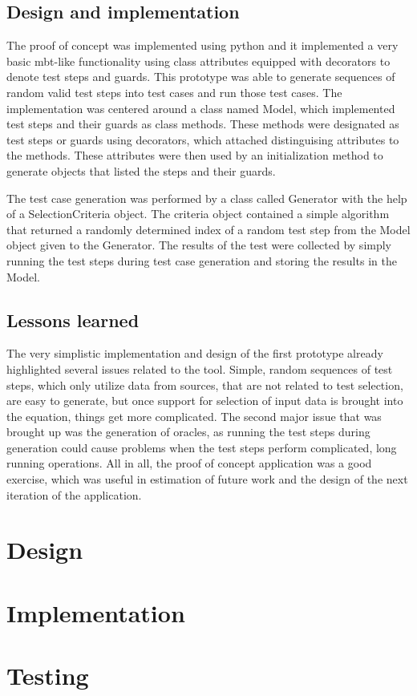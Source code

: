 \subsection{Design and implementation}
The proof of concept was implemented using python and it implemented a very basic mbt-like functionality using class attributes equipped with decorators to denote test steps and guards. This prototype was able to generate sequences of random valid test steps into test cases and run those test cases. The implementation was centered around a class named Model, which implemented test steps and their guards as class methods. These methods were designated as test steps or guards using decorators, which attached distinguising attributes to the methods. These attributes were then used by an initialization method to generate objects that listed the steps and their guards. 

The test case generation was performed by a class called Generator with the help of a SelectionCriteria object. The criteria object contained a simple algorithm that returned a randomly determined index of a random test step from the Model object given to the Generator. The results of the test were collected by simply running the test steps during test case generation and storing the results in the Model. 

\subsection{Lessons learned}
The very simplistic implementation and design of the first prototype already highlighted several issues related to the tool. Simple, random sequences of test steps, which only utilize data from sources, that are not related to test selection, are easy to generate, but once support for selection of input data is brought into the equation, things get more complicated. The second major issue that was brought up was the generation of oracles, as running the test steps during generation could cause problems when the test steps perform complicated, long running operations. All in all, the proof of concept application was a good exercise, which was useful in estimation of future work and the design of the next iteration of the application.


\section{Design}

\section{Implementation}

\section{Testing}